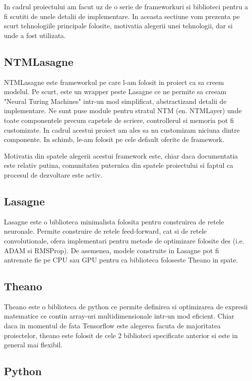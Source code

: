 \documentclass[12pt]{article}
\begin{document}
In cadrul proiectului am facut uz de o serie de frameworkuri si biblioteci pentru a fi scutiti de unele detalii de implementare. In aceasta sectiune vom prezenta pe scurt tehnologiile principale folosite, motivatia alegerii unei tehnologii, dar si unde a fost utilizata.

\subsection{NTMLasagne}

NTMLasagne este frameworkul pe care l-am folosit in proiect ca sa creem modelul. Pe scurt, este un wrapper peste Lasagne  ce ne permite sa creeam "Neural Turing Machines" intr-un mod simplificat, abstractizand detalii de implementare. Ne sunt puse module pentru stratul NTM (en. NTMLayer) unde toate componentele precum capetele de scriere, controllerul si memoria pot fi customizate. In cadrul acestui proiect am ales sa nu customizam niciuna dintre componente. In schimb, le-am folosit pe cele default oferite de framework.

Motivatia din spatele alegerii acestui framework este, chiar daca documentatia este relativ putina, comunitatea puternica din spatele proiectului si faptul ca procesul de dezvoltare este activ.


\subsection{Lasagne}

Lasagne este o biblioteca minimalista folosita pentru construirea de retele neuronale. Permite construire de retele feed-forward, cat si de retele convolutionale, ofera implementari pentru metode de optimizare folosite des (i.e. ADAM si RMSProp). De asemenea, modele construite in Lasagne pot fi antrenate fie pe CPU sau GPU pentru ca biblioteca foloseste Theano in spate.


\subsection{Theano}

Theano este o biblioteca de python ce permite definirea si optimizarea de expresii matematice ce contin array-uri multidimensionale intr-un mod eficient. Chiar daca in momentul de fata Tensorflow este alegerea facuta de majoritatea proiectelor, theano este folosit de cele 2 biblioteci specificate anterior si este in general mai flexibil.

\subsection{Python}
\end{document}
